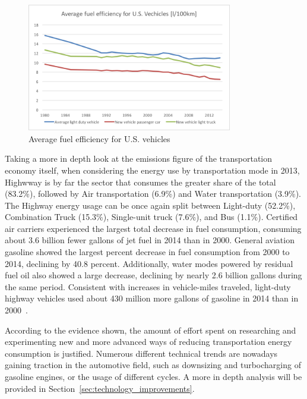 \begin{figure}[ht]
  \centering
  \includegraphics[width=0.8\textwidth]{figures/introduction/average_fuel_efficiency.png}
  \caption{Average fuel efficiency for U.S. vehicles \label{fig:average_fuel_efficiency} }
\end{figure}

Taking a more in depth look at the emissions figure of the transportation economy itself, when considering the energy use by transportation mode in 2013, Highwway is by far the sector that consumes the greater share of the total (83.2\%), followed by Air transportation (6.9\%) and Water transportation (3.9\%). The Highway energy usage can be once again split between Light-duty (52.2\%), Combination Truck (15.3\%), Single-unit truck (7.6\%), and Bus (1.1\%). Certified air carriers experienced the largest total decrease in fuel consumption, consuming about 3.6 billion fewer gallons of jet fuel in 2014 than in 2000. General aviation gasoline showed the largest percent decrease in fuel consumption from 2000 to 2014, declining by 40.8 percent. Additionally, water modes powered by residual fuel oil also showed a large decrease, declining by nearly 2.6 billion gallons during the same period. Consistent with increases in vehicle-miles traveled, light-duty highway vehicles used about 430 million more gallons of gasoline in 2014 than in 2000~\cite{BureauofTransportationStatistics2016a}.

According to the evidence shown, the amount of effort spent on researching and experimenting new and more advanced ways of reducing transportation energy consumption is justified. Numerous different technical trends are nowadays gaining traction in the automotive field, such as downsizing and turbocharging of gasoline engines, or the usage of different cycles. A more in depth analysis will be provided in Section~\ref{sec:technology_improvements}.

